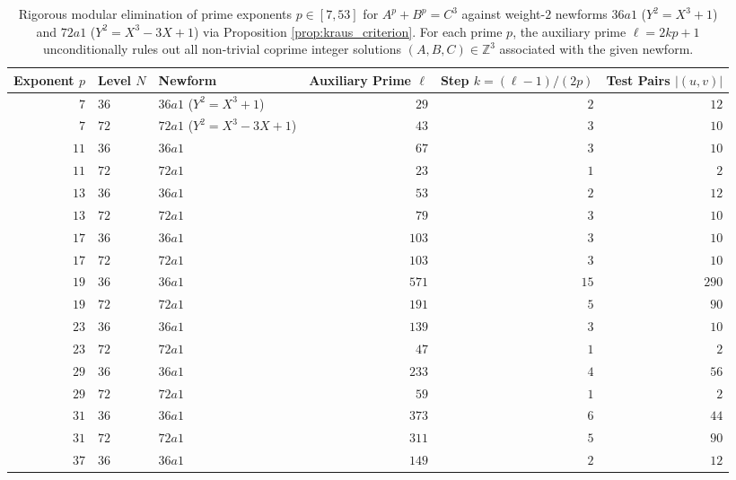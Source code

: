 \documentclass[11pt, a4paper]{amsart}
\theoremstyle{definition}
\newcommand{\Z}{\mathbb{Z}}
\begin{document}
\begin{table}[htbp]
\centering
\caption{Rigorous modular elimination of prime exponents $p \in [7, 53]$ for $A^p + B^p = C^3$ against weight-$2$ newforms $36a1$ ($Y^2 = X^3 + 1$) and $72a1$ ($Y^2 = X^3 - 3X + 1$) via Proposition \ref{prop:kraus_criterion}. For each prime $p$, the auxiliary prime $\ell = 2kp + 1$ unconditionally rules out all non-trivial coprime integer solutions $(A, B, C) \in \Z^3$ associated with the given newform.}
\label{tab:kraus_modular}
\footnotesize
\begin{tabular}{@{}rllrrr@{}}
\toprule
Exponent $p$ & Level $N$ & Newform & Auxiliary Prime $\ell$ & Step $k = (\ell-1)/(2p)$ & Test Pairs $|(u,v)|$ \\
\midrule
$7$  & $36$ & $36a1$ ($Y^2 = X^3 + 1$)      & $29$   & $2$  & $12$ \\
$7$  & $72$ & $72a1$ ($Y^2 = X^3 - 3X + 1$) & $43$   & $3$  & $10$ \\
$11$ & $36$ & $36a1$                        & $67$   & $3$  & $10$ \\
$11$ & $72$ & $72a1$                        & $23$   & $1$  & $2$ \\
$13$ & $36$ & $36a1$                        & $53$   & $2$  & $12$ \\
$13$ & $72$ & $72a1$                        & $79$   & $3$  & $10$ \\
$17$ & $36$ & $36a1$                        & $103$  & $3$  & $10$ \\
$17$ & $72$ & $72a1$                        & $103$  & $3$  & $10$ \\
$19$ & $36$ & $36a1$                        & $571$  & $15$ & $290$ \\
$19$ & $72$ & $72a1$                        & $191$  & $5$  & $90$ \\
$23$ & $36$ & $36a1$                        & $139$  & $3$  & $10$ \\
$23$ & $72$ & $72a1$                        & $47$   & $1$  & $2$ \\
$29$ & $36$ & $36a1$                        & $233$  & $4$  & $56$ \\
$29$ & $72$ & $72a1$                        & $59$   & $1$  & $2$ \\
$31$ & $36$ & $36a1$                        & $373$  & $6$  & $44$ \\
$31$ & $72$ & $72a1$                        & $311$  & $5$  & $90$ \\
$37$ & $36$ & $36a1$                        & $149$  & $2$  & $12$ \\

\end{tabular}
\end{table}
\end{document}
